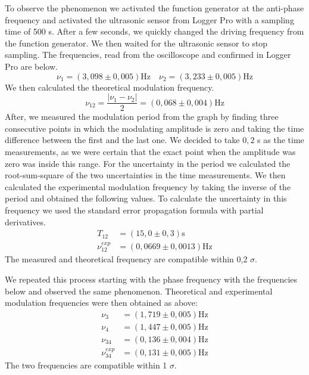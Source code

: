 \documentclass{article}
\begin{document}
To observe the phenomenon we activated the function generator at the anti-phase frequency and activated the ultrasonic sensor from Logger Pro with a sampling time of 500 s. After a few seconds, we quickly changed the driving frequency from the function generator. We then waited for the ultrasonic sensor to stop sampling. The frequencies, read from the oscilloscope and confirmed in Logger Pro are below.
\begin{equation}
    \nu_1 = ( 3,098 \pm 0,005) \text{Hz} \quad \nu_2 = ( 3,233 \pm 0,005) \text{Hz} 
\end{equation}
We then calculated the theoretical modulation frequency.
\begin{equation}
    \nu_{12} = \frac{|\nu_1 - \nu_2|}{2} = (0,068 \pm 0,004) \text{Hz}
\end{equation}
After, we measured the modulation period from the graph by finding three consecutive points in which the modulating amplitude is zero and taking the time difference between the first and the last one. We decided to take $0,2$ s as the time measurements, as we were certain that the exact point when the amplitude was zero was inside this range. For the uncertainty in the period we calculated the root-sum-square of the two uncertainties in the time measurements. We then calculated the experimental modulation frequency by taking the inverse of the period and obtained the following values. To calculate the uncertainty in this frequency we used the standard error propagation formula with partial derivatives.
\begin{align}
    T_{12} &= (15,0 \pm 0,3) \text{s} \\
    \nu_{12}^{exp} &= (0,0669 \pm 0,0013) \text{Hz} 
\end{align}
The measured and theoretical frequency are compatible within 0,2 $\sigma$.

We repeated this process starting with the phase frequency with the frequencies below and observed the same phenomenon. Theoretical and experimental modulation frequencies were then obtained as above:
\begin{align}
    \nu_{3} &= (1,719 \pm 0,005) \text{Hz} \\
    \nu_{4} &= (1,447 \pm 0,005) \text{Hz} \\
    \nu_{34} &= (0,136 \pm 0,004) \text{Hz} \\
    \nu_{34}^{exp} &= (0,131 \pm 0,005) \text{Hz} 
\end{align}
The two frequencies are compatible within 1 $\sigma$.
\end{document}
